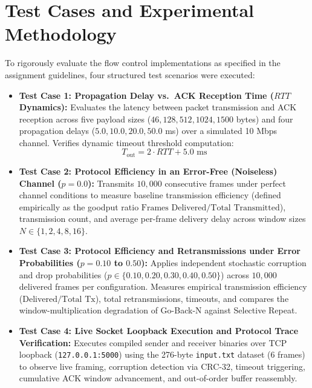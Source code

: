 \documentclass[11pt,a4paper]{article}
\begin{document}
\section{Test Cases and Experimental Methodology}

To rigorously evaluate the flow control implementations as specified in the assignment guidelines, four structured test scenarios were executed:

\begin{itemize}
    \item \textbf{Test Case 1: Propagation Delay vs.\ ACK Reception Time (\(RTT\) Dynamics):}
    Evaluates the latency between packet transmission and ACK reception across five payload sizes (\(46, 128, 512, 1024, 1500\) bytes) and four propagation delays (\(5.0, 10.0, 20.0, 50.0\) ms) over a simulated 10 Mbps channel. Verifies dynamic timeout threshold computation:
    \begin{equation}
        T_{\text{out}} = 2 \cdot RTT + 5.0\text{ ms}
    \end{equation}

    \item \textbf{Test Case 2: Protocol Efficiency in an Error-Free (Noiseless) Channel (\(p = 0.0\)):}
    Transmits \(10{,}000\) consecutive frames under perfect channel conditions to measure baseline transmission efficiency (defined empirically as the goodput ratio \(\text{Frames Delivered} / \text{Total Transmitted}\)), transmission count, and average per-frame delivery delay across window sizes \(N \in \{1, 2, 4, 8, 16\}\).

    \item \textbf{Test Case 3: Protocol Efficiency and Retransmissions under Error Probabilities (\(p = 0.10\) to \(0.50\)):}
    Applies independent stochastic corruption and drop probabilities (\(p \in \{0.10, 0.20, 0.30, 0.40, 0.50\}\)) across \(10{,}000\) delivered frames per configuration. Measures empirical transmission efficiency (\(\text{Delivered} / \text{Total Tx}\)), total retransmissions, timeouts, and compares the window-multiplication degradation of Go-Back-N against Selective Repeat.

    \item \textbf{Test Case 4: Live Socket Loopback Execution and Protocol Trace Verification:}
    Executes compiled sender and receiver binaries over TCP loopback (\texttt{127.0.0.1:5000}) using the 276-byte \texttt{input.txt} dataset (6 frames) to observe live framing, corruption detection via CRC-32, timeout triggering, cumulative ACK window advancement, and out-of-order buffer reassembly.
\end{itemize}
\end{document}
